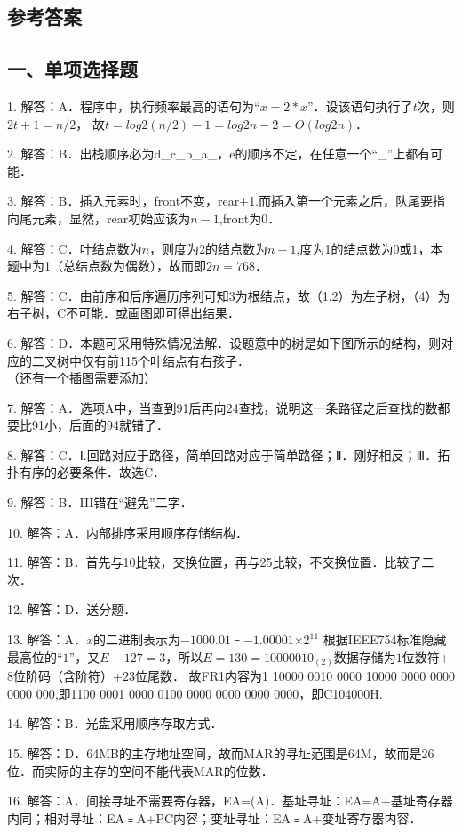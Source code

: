 \subsection{参考答案}
\subsection{一、单项选择题}
1. 解答：A．程序中，执行频率最高的语句为“$x=2*x$”．设该语句执行了$t$次，则$2t+1=n/2$， 故$t=log2(n/2)-1=log2n-2= O(log2n)$．

2. 解答：B．出栈顺序必为d_c_b_a_，e的顺序不定，在任意一个“_”上都有可能．

3. 解答：B．插入元素时，front不变，rear+1.而插入第一个元素之后，队尾要指向尾元素，显然，rear初始应该为$n-1$,front为$0$．

4. 解答：C．叶结点数为$n$，则度为2的结点数为$n-1$,度为1的结点数为0或1，本题中为1（总结点数为偶数），故而即$2n=768$．

5. 解答：C．由前序和后序遍历序列可知3为根结点，故（1,2）为左子树，（4）为右子树，C不可能．或画图即可得出结果．

6. 解答：D．本题可采用特殊情况法解．设题意中的树是如下图所示的结构，则对应的二叉树中仅有前115个叶结点有右孩子．\\
（还有一个插图需要添加）

7. 解答：A．选项A中，当查到91后再向24查找，说明这一条路径之后查找的数都要比91小，后面的94就错了．

8. 解答：C．Ⅰ.回路对应于路径，简单回路对应于简单路径；Ⅱ．刚好相反；Ⅲ．拓扑有序的必要条件．故选C．

9. 解答：B．III错在“避免”二字．

10. 解答：A．内部排序采用顺序存储结构．

11. 解答：B．首先与10比较，交换位置，再与25比较，不交换位置．比较了二次．

12. 解答：D．送分题．

13. 解答：A．$x$的二进制表示为$-1000.01$﹦$-1.000 01$×$2^{11}$ 根据IEEE754标准隐藏最高位的“$1$”，又$E-127=3$，所以$E=130=1000 0010_{(2)}$数据存储为$1$位数符+$8$位阶码（含阶符）+$23$位尾数．
故FR1内容为1 10000 0010 0000 10000 0000 0000 0000 000,即1100 0001 0000 0100 0000 0000 0000 0000，即C104000H.

14. 解答：B．光盘采用顺序存取方式．

15. 解答：D．64MB的主存地址空间，故而MAR的寻址范围是64M，故而是26位．而实际的主存的空间不能代表MAR的位数．

16. 解答：A．间接寻址不需要寄存器，EA=(A)．基址寻址：EA=A+基址寄存器内同；相对寻址：EA﹦A+PC内容；变址寻址：EA﹦A+变址寄存器内容．

